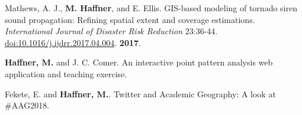 \begin{cventries}
   \cventry
      {}
      {}
      {}
      {}
      {
        \begin{cvitems}
          \vspace{-4mm}
        \item {Mathews, A. J., \textbf{M. Haffner}, and E. Ellis. GIS-based modeling
            of tornado siren sound propagation: Refining spatial extent and
            coverage estimations. \textit{International Journal of Disaster Risk
              Reduction} 23:36-44.
            \href{https://doi.org/10.1016/j.ijdrr.2017.04.004}{doi:10.1016/j.ijdrr.2017.04.004}.}
          \textbf{2017}.\\
          \vspace{-2mm}
        \end{cvitems}
    }

\end{cventries}

\newpage



\begin{cventries}
   \cventry
      {}
      {}
      {}
      {}
      {
        \begin{cvitems}
          \vspace{-4mm}
        \item
          {\textbf{Haffner, M.} and J. C. Comer.
            An interactive point pattern analysis web application and teaching
            exercise.} \\
          \vspace{-2mm}
        \end{cvitems}
    }

   \cventry
      {}
      {}
      {}
      {}
      {
        \begin{cvitems}
          \vspace{-4mm}
        \item
          {Fekete, E. and \textbf{Haffner, M.}.
            Twitter and Academic Geography: A look at \#AAG2018.} \\
          \vspace{-2mm}
        \end{cvitems}
    }

\end{cventries}

